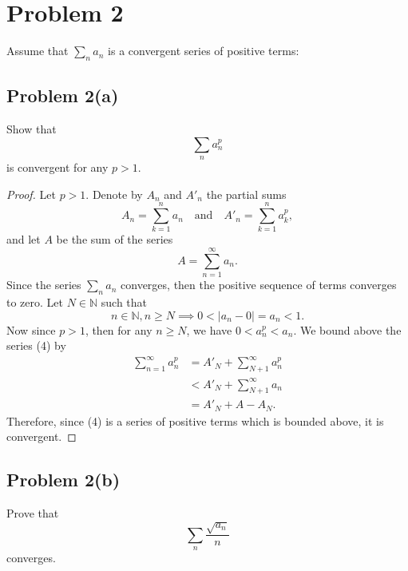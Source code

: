 \documentclass[12pt]{article}
\newenvironment{problem}
    {\begin{lrbox}{\mybox}\begin{minipage}{0.98\textwidth}}
    {\end{minipage}\end{lrbox}\framebox[\textwidth]{\usebox{\mybox}}}
\newcommand{\isp}[1]{\quad\text{#1}\quad}
\newcommand{\N}{\mathbb{N}} %
\newcommand{\<}{\left\langle} %
\renewcommand{\>}{\right\rangle} %
\begin{document}
\newpage
\section*{Problem 2}
\begin{problem}
    Assume that $\sum_n a_n$ is a convergent series of positive terms:  
\end{problem}

\subsection*{Problem 2(a)}
\begin{problem}
    Show that 
    \begin{equation}
        \sum_n a_n^p
    \end{equation}
    is convergent for any $p>1$.
\end{problem}

\begin{proof}
    Let $p > 1$. Denote by $A_n$ and $A'_n$ the partial sums
    \[
        A_n = \sum_{k = 1}^n a_n \isp{and} A'_n = \sum_{k = 1}^n a_k^p,
    \]
    and let $A$ be the sum of the series
    \[
        A = \sum_{n = 1}^\infty a_n.
    \]
    Since the series $\sum_n a_n$ converges, then the positive sequence of terms converges to zero. Let $N \in \N$ such that
    \[
        n \in \N, n \geq N \implies 0 < |a_n - 0| = a_n < 1.
    \]
    Now since $p > 1$, then for any $n \geq N$, we have $0 < a_n^p < a_n$. We bound above the series (4) by
    \begin{align*}
        \sum_{n = 1}^\infty a_n^p 
            &= A'_N + \sum_{N + 1}^\infty a_n^p \\
            &< A'_N + \sum_{N + 1}^\infty a_n \\
            &= A'_N + A - A_N.
    \end{align*}
    Therefore, since (4) is a series of positive terms which is bounded above, it is convergent.
    
\end{proof}

\newpage
\subsection*{Problem 2(b)}
\begin{problem}
    Prove that 
    \begin{equation}
        \sum_n \frac{\sqrt{a_n}}{n}
    \end{equation}
    converges.
\end{problem}
\end{document}
